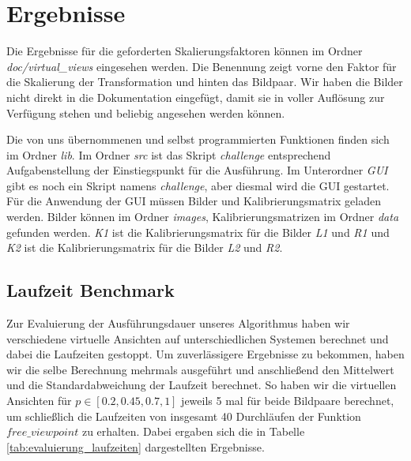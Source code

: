 \section{Ergebnisse}
Die Ergebnisse für die geforderten Skalierungsfaktoren können im Ordner \textit{doc/virtual\_views} eingesehen werden. Die Benennung zeigt vorne den Faktor für die Skalierung der Transformation und hinten das Bildpaar. Wir haben die Bilder nicht direkt in die Dokumentation eingefügt, damit sie in voller Auflösung zur Verfügung stehen und beliebig angesehen werden können.

Die von uns übernommenen und selbst programmierten Funktionen finden sich im Ordner \textit{lib}. Im Ordner \textit{src} ist das Skript \textit{challenge} entsprechend Aufgabenstellung der Einstiegspunkt für die Ausführung. Im Unterordner \textit{GUI} gibt es noch ein Skript namens \textit{challenge}, aber diesmal wird die GUI gestartet. Für die Anwendung der GUI müssen Bilder und Kalibrierungsmatrix geladen werden. Bilder können im Ordner \textit{images}, Kalibrierungsmatrizen im Ordner \textit{data} gefunden werden. \textit{K1} ist die Kalibrierungsmatrix für die Bilder \textit{L1} und \textit{R1} und \textit{K2} ist die Kalibrierungsmatrix für die Bilder \textit{L2} und \textit{R2}.

\subsection{Laufzeit Benchmark}
Zur Evaluierung der Ausführungsdauer unseres Algorithmus haben wir verschiedene virtuelle Ansichten auf unterschiedlichen Systemen berechnet und dabei die Laufzeiten gestoppt. Um zuverlässigere Ergebnisse zu bekommen, haben wir die selbe Berechnung mehrmals ausgeführt und anschließend den Mittelwert und die Standardabweichung der Laufzeit berechnet. So haben wir die virtuellen Ansichten für $p \in [0.2, 0.45, 0.7, 1]$ jeweils 5 mal für beide Bildpaare berechnet, um schließlich die Laufzeiten von insgesamt 40 Durchläufen der Funktion $free\_viewpoint$ zu erhalten. Dabei ergaben sich die in Tabelle \ref{tab:evaluierung_laufzeiten} dargestellten Ergebnisse.

